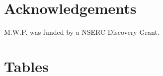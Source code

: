 \documentclass[a4paper,11pt]{article}
\begin{document}
%





\section{Acknowledgements}

M.W.P. was funded by a NSERC Discovery Grant.

\newpage

\section{Tables}
\end{document}
